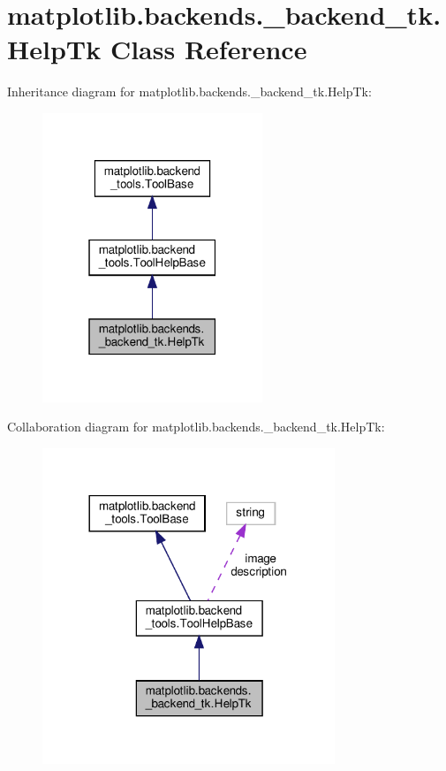 \hypertarget{classmatplotlib_1_1backends_1_1__backend__tk_1_1HelpTk}{}\section{matplotlib.\+backends.\+\_\+backend\+\_\+tk.\+Help\+Tk Class Reference}
\label{classmatplotlib_1_1backends_1_1__backend__tk_1_1HelpTk}


Inheritance diagram for matplotlib.\+backends.\+\_\+backend\+\_\+tk.\+Help\+Tk\+:
\nopagebreak
\begin{figure}[H]
\begin{center}
\leavevmode
\includegraphics[width=187pt]{classmatplotlib_1_1backends_1_1__backend__tk_1_1HelpTk__inherit__graph}
\end{center}
\end{figure}


Collaboration diagram for matplotlib.\+backends.\+\_\+backend\+\_\+tk.\+Help\+Tk\+:
\nopagebreak
\begin{figure}[H]
\begin{center}
\leavevmode
\includegraphics[width=248pt]{classmatplotlib_1_1backends_1_1__backend__tk_1_1HelpTk__coll__graph}
\end{center}
\end{figure}
